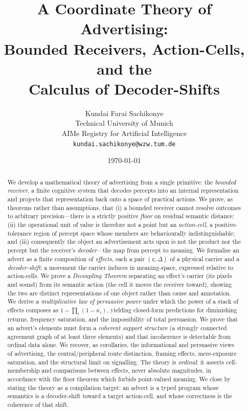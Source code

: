 \documentclass[twocolumn,11pt,a4paper]{article}
\title{\bfseries A Coordinate Theory of Advertising:\\
Bounded Receivers, Action-Cells, and the\\
Calculus of Decoder-Shifts}
\author{
Kundai Farai Sachikonye\\
Technical University of Munich\\
AIMe Registry for Artificial Intelligence\\
\texttt{kundai.sachikonye@wzw.tum.de}
}
\date{\today}
\theoremstyle{adv}
\theoremstyle{definition}
\theoremstyle{remark}
\newcommand{\Carrier}{\kappa}         %
\renewcommand{\Carrier}{\mathsf{c}}
\newcommand{\shift}{\Delta}            %
\newcommand{\pot}{\kappa}             %
\begin{document}
\maketitle

\begin{abstract}
\noindent
We develop a mathematical theory of advertising from a single primitive:
the \emph{bounded receiver}, a finite cognitive system that decodes
percepts into an internal representation and projects that representation
back onto a space of practical actions. We prove, as theorems rather than
assumptions, that (i) a bounded receiver cannot resolve outcomes to
arbitrary precision---there is a strictly positive \emph{floor} on
residual semantic distance; (ii) the operational unit of value is
therefore not a point but an \emph{action-cell}, a positive-tolerance
region of percept space whose members are behaviourally
indistinguishable; and (iii) consequently the object an advertisement
acts upon is not the product nor the percept but the receiver's
\emph{decoder}---the map from percept to meaning. We formalise an advert
as a finite composition of \emph{effects}, each a pair $(\Carrier,\shift)$
of a physical carrier and a \emph{decoder-shift}: a movement the carrier
induces in meaning-space, expressed relative to action-cells. We prove a
\emph{Decoupling Theorem} separating an effect's carrier (its pixels and
sound) from its semantic action (the cell it moves the receiver toward),
showing the two are distinct representations of one object rather than
cause and annotation. We derive a \emph{multiplicative law of persuasive
power} under which the power of a stack of effects composes as
$1-\prod_i(1-\pot_i)$, yielding closed-form predictions for diminishing
returns, frequency saturation, and the impossibility of total persuasion.
We prove that an advert's elements must form a \emph{coherent support
structure} (a strongly connected agreement graph of at least three
elements) and that incoherence is detectable from ordinal data alone. We
recover, as corollaries, the informational and persuasive views of
advertising, the central/peripheral route distinction, framing effects,
mere-exposure saturation, and the structural limit on signalling. The
theory is \emph{ordinal}: it asserts cell-membership and comparisons
between effects, never absolute magnitudes, in accordance with the floor
theorem which forbids point-valued meaning. We close by stating the
theory as a compilation target: an advert is a typed program whose
semantics is a decoder-shift toward a target action-cell, and whose
correctness is the coherence of that shift.
\end{abstract}
\end{document}
